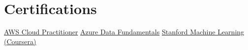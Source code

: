 \documentclass[a4paper,10pt]{article}
\begin{document}
\section{\textbf{Certifications}}
\footnotesize{
\href{https://drive.google.com/file/d/1a3exoiS79RS3q8vSJHT-PpkczSPg54EZ/view}{AWS Cloud Practitioner} \hfill \href{https://drive.google.com/file/d/1VBJjfRMsIm8BckoUtLUV7ZbY88Jju2qT/view}{Azure Data Fundamentals} \hfill \href{https://drive.google.com/file/d/1At3BLkqJ9vuhPPUCcrNAw9yNH5li7XdQ/view}{Stanford Machine Learning (Coursera)}
}
\end{document}
